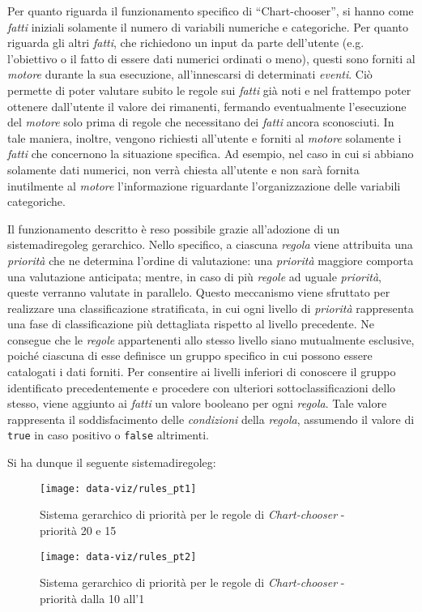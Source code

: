 \bigskip
\noindent Per quanto riguarda il funzionamento specifico di ``Chart-chooser'', si hanno come \emph{fatti} iniziali solamente il numero di variabili numeriche e categoriche. 
Per quanto riguarda gli altri \emph{fatti}, che richiedono un input da parte dell'utente (e.g. l'obiettivo o il fatto di essere dati numerici ordinati o meno), questi sono 
forniti al \emph{motore} durante la sua esecuzione, all'innescarsi di determinati \emph{eventi}. 
Ciò permette di poter valutare subito le regole sui \emph{fatti} già noti e nel frattempo poter ottenere dall'utente il valore dei rimanenti, fermando eventualmente l'esecuzione del \emph{motore} solo
prima di regole che necessitano dei \emph{fatti} ancora sconosciuti. %
In tale maniera, inoltre, vengono richiesti all'utente e forniti al \emph{motore} solamente i \emph{fatti} che concernono la situazione specifica. Ad esempio, nel caso in cui si abbiano solamente dati numerici, 
non verrà chiesta all'utente e non sarà fornita inutilmente al \emph{motore} l'informazione riguardante l'organizzazione delle variabili categoriche.

Il funzionamento descritto è reso possibile grazie all'adozione di un \gls{sistemadiregoleg} gerarchico. Nello specifico, a ciascuna \emph{regola} viene attribuita una \emph{priorità} che ne determina l'ordine di valutazione:
una \emph{priorità} maggiore comporta una valutazione anticipata; mentre, in caso di più \emph{regole} ad uguale \emph{priorità}, queste verranno valutate in parallelo.
Questo meccanismo viene sfruttato per realizzare una classificazione stratificata, in cui ogni livello di \emph{priorità} rappresenta una fase di classificazione più dettagliata rispetto al livello precedente. 
Ne consegue che le \emph{regole} appartenenti allo stesso livello siano mutualmente esclusive, poiché ciascuna di esse definisce un gruppo specifico in cui possono essere catalogati i dati forniti.
Per consentire ai livelli inferiori di conoscere il gruppo identificato precedentemente e procedere con ulteriori sottoclassificazioni dello stesso, viene aggiunto ai \emph{fatti} un valore booleano per ogni \emph{regola}. 
Tale valore rappresenta il soddisfacimento delle \emph{condizioni} della \emph{regola}, assumendo il valore di \texttt{true} in caso positivo o \texttt{false} altrimenti.

\bigskip
\noindent Si ha dunque il seguente \gls{sistemadiregoleg}:

\begin{figure}[H] 
    \centering 
    \texttt{[image: data-viz/rules\_pt1]} 
    \caption{Sistema gerarchico di priorità per le regole di \emph{Chart-chooser} - priorità 20 e 15}
    \label{fig:rules_pt1}
\end{figure}
\begin{figure}[H] 
    \centering 
    \texttt{[image: data-viz/rules\_pt2]} 
    \caption{Sistema gerarchico di priorità per le regole di \emph{Chart-chooser} - priorità dalla 10 all'1}
    \label{fig:rules_pt2}
\end{figure}

